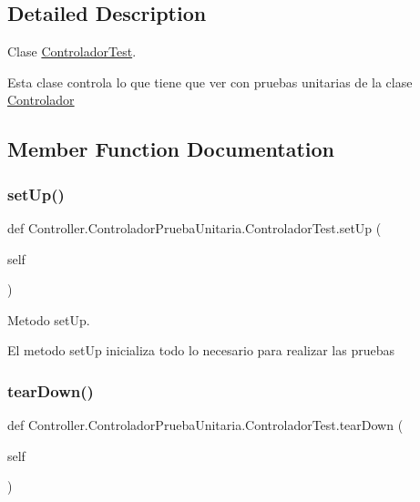 \subsection{Detailed Description}
Clase \hyperlink{class_controller_1_1_controlador_prueba_unitaria_1_1_controlador_test}{Controlador\+Test}. 

Esta clase controla lo que tiene que ver con pruebas unitarias de la clase \hyperlink{namespace_controller_1_1_controlador}{Controlador} 

\subsection{Member Function Documentation}
\mbox{\label{class_controller_1_1_controlador_prueba_unitaria_1_1_controlador_test_a2e8184870a51acab5ddda57d6ae0a6af}} 
\subsubsection{\texorpdfstring{set\+Up()}{setUp()}}
{\footnotesize\ttfamily def Controller.\+Controlador\+Prueba\+Unitaria.\+Controlador\+Test.\+set\+Up (\begin{DoxyParamCaption}\item[{}]{self }\end{DoxyParamCaption})}



Metodo set\+Up. 

El metodo set\+Up inicializa todo lo necesario para realizar las pruebas \mbox{\label{class_controller_1_1_controlador_prueba_unitaria_1_1_controlador_test_a0aa297aa7af4503138e4e84d3fcd40d2}} 
\subsubsection{\texorpdfstring{tear\+Down()}{tearDown()}}
{\footnotesize\ttfamily def Controller.\+Controlador\+Prueba\+Unitaria.\+Controlador\+Test.\+tear\+Down (\begin{DoxyParamCaption}\item[{}]{self }\end{DoxyParamCaption})}

